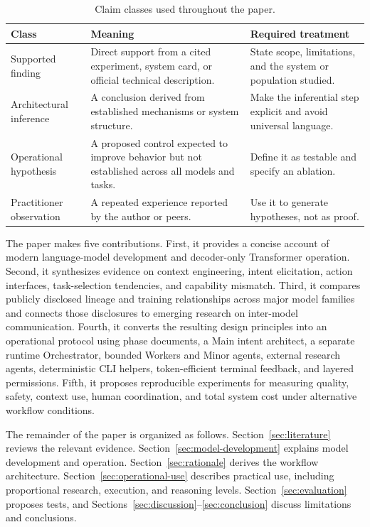 \documentclass[11pt,a4paper]{article}
\begin{document}
\begin{table}[H]
\centering
\caption{Claim classes used throughout the paper.}
\begin{tabularx}{\textwidth}{P{0.22\textwidth}Y Y}
\toprule
\textbf{Class} & \textbf{Meaning} & \textbf{Required treatment} \\
\midrule
Supported finding & Direct support from a cited experiment, system card, or official technical description. & State scope, limitations, and the system or population studied. \\
Architectural inference & A conclusion derived from established mechanisms or system structure. & Make the inferential step explicit and avoid universal language. \\
Operational hypothesis & A proposed control expected to improve behavior but not established across all models and tasks. & Define it as testable and specify an ablation. \\
Practitioner observation & A repeated experience reported by the author or peers. & Use it to generate hypotheses, not as proof. \\
\bottomrule
\end{tabularx}
\end{table}

The paper makes five contributions. First, it provides a concise account of modern language-model development and decoder-only Transformer operation. Second, it synthesizes evidence on context engineering, intent elicitation, action interfaces, task-selection tendencies, and capability mismatch. Third, it compares publicly disclosed lineage and training relationships across major model families and connects those disclosures to emerging research on inter-model communication. Fourth, it converts the resulting design principles into an operational protocol using phase documents, a Main intent architect, a separate runtime Orchestrator, bounded Workers and Minor agents, external research agents, deterministic CLI helpers, token-efficient terminal feedback, and layered permissions. Fifth, it proposes reproducible experiments for measuring quality, safety, context use, human coordination, and total system cost under alternative workflow conditions.

The remainder of the paper is organized as follows. Section~\ref{sec:literature} reviews the relevant evidence. Section~\ref{sec:model-development} explains model development and operation. Section~\ref{sec:rationale} derives the workflow architecture. Section~\ref{sec:operational-use} describes practical use, including proportional research, execution, and reasoning levels. Section~\ref{sec:evaluation} proposes tests, and Sections~\ref{sec:discussion}--\ref{sec:conclusion} discuss limitations and conclusions.
\end{document}
